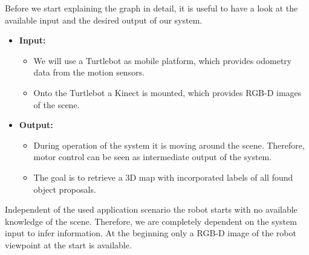 \documentclass[a4paper,11pt,english]{article}
\begin{document}
Before we start explaining the graph in detail, it is useful to have a look at the available input and the desired output of our system.
\begin{itemize}
	\item \textbf{Input:}
	\begin{itemize}
		\item We will use a Turtlebot as mobile platform, which provides odometry data from the motion sensors.
		\item Onto the Turtlebot a Kinect is mounted, which provides RGB-D images of the scene.
	\end{itemize}
	\item \textbf{Output:}
	\begin{itemize}
		\item During operation of the system it is moving around the scene. Therefore, motor control can be seen as intermediate output of the system.
		\item The goal is to retrieve a 3D map with incorporated labels of all found object proposals.
	\end{itemize}  
\end{itemize}
Independent of the used application scenario the robot starts with no available knowledge of the scene.
Therefore, we are completely dependent on the system input to infer information.
At the beginning only a RGB-D image of the robot viewpoint at the start is available.
\end{document}
